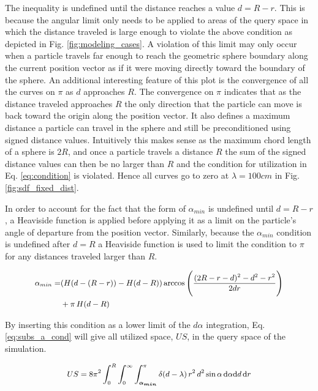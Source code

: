 The inequality is undefined until the distance reaches a value $d = R- r$. This
is because the angular limit only needs to be applied to areas of the query
space in which the distance traveled is large enough to violate the above
condition as depicted in Fig. \ref{fig:modeling_cases}. A violation of this
limit may only occur when a particle travels far enough to reach the geometric
sphere boundary along the current position vector as if it were moving directly
toward the boundary of the sphere. An additional interesting feature of this
plot is the convergence of all the curves on $\pi$ as $d$ approaches $R$. The
convergence on $\pi$ indicates that as the distance traveled approaches $R$ the
only direction that the particle can move is back toward the origin along the
position vector. It also defines a maximum distance a particle can travel in the
sphere and still be preconditioned using signed distance values. Intuitively
this makes sense as the maximum chord length of a sphere is $2R$, and once a
particle travels a distance $R$ the sum of the signed distance values can then
be no larger than $R$ and the condition for utilization in Eq. \ref{eq:condition} is
violated. Hence all curves go to zero at $\lambda = 100 cm$ in
Fig. \ref{fig:sdf_fixed_dist}.

In order to account for the fact that the form of $\alpha_{min}$ is undefined
until $d = R-r$, a Heaviside function is applied before applying it as a limit
on the particle's angle of departure from the position vector. Similarly,
because the $\alpha_{min}$ condition is undefined after $d=R$ a Heaviside
function is used to limit the condition to $\pi$ for any distances traveled
larger than $R$.

\begin{equation}
  \small
  \begin{split}
  \alpha_{min} =& (H(d-(R-r))-H(d-R)) \arccos\Bigg ( \frac{(2R-r-d)^2-d^2-r^2}{2 d r} \Bigg ) \\
  &+ \pi \, H(d-R)
  \end{split}
\end{equation}


By inserting this condition as a lower limit of the $d\alpha$ integration,
Eq. \ref{eq:subs_a_cond} will give all utilized space, $US$, in the query space
of the simulation.

\begin{equation}
\small US = 8\pi^2  \int_{0}^{R}\int_{0}^{\infty}\int_{\boldsymbol{\alpha_{min}}}^{\pi} \delta(d-\lambda) \,
r^2 \, d^2 \sin{\alpha} \, \mathrm{d}\alpha \mathrm{d}d \, \mathrm{d}r
\label{eq:subs_a_cond}
\end{equation}

